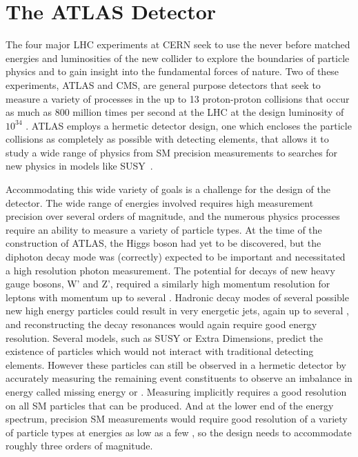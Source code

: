 \chapter{The ATLAS Detector}

\label{ch:atlas}

The four major \ac{LHC} experiments at \ac{CERN} seek to use the never before matched energies and luminosities of the new collider to explore the boundaries of particle physics and to gain insight into the fundamental forces of nature.
Two of these experiments, ATLAS and \ac{CMS}, are general purpose detectors that seek to measure a variety of processes in the up to 13 \TeV proton-proton collisions that occur as much as 800 million times per second at the \ac{LHC} at the design luminosity of $10^{34}$ \lcms. 
ATLAS employs a hermetic detector design, one which encloses the particle collisions as completely as possible with detecting elements, that allows it to study a wide range of physics from \ac{SM} precision measurements to searches for new physics in models like \ac{SUSY}~\cite{atlas_experiment}.

Accommodating this wide variety of goals is a challenge for the design of the detector.
The wide range of energies involved requires high measurement precision over several orders of magnitude, and the numerous physics processes require an ability to measure a variety of particle types.
At the time of the construction of ATLAS, the Higgs boson had yet to be discovered, but the diphoton decay mode was (correctly) expected to be important and necessitated a high resolution photon measurement.
The potential for decays of new heavy gauge bosons, W' and Z', required a similarly high momentum resolution for leptons with momentum up to several \TeV.
Hadronic decay modes of several possible new high energy particles could result in very energetic jets, again up to several \TeV, and reconstructing the decay resonances would again require good energy resolution.
Several models, such as \ac{SUSY} or Extra Dimensions, predict the existence of particles which would not interact with traditional detecting elements. 
However these particles can still be observed in a hermetic detector by accurately measuring the remaining event constituents to observe an imbalance in energy called missing energy or \met. 
Measuring \met implicitly requires a good resolution on all \ac{SM} particles that can be produced.
And at the lower end of the energy spectrum, precision \ac{SM} measurements would require good resolution of a variety of particle types at energies as low as a few \GeV, so the design needs to accommodate roughly three orders of magnitude.

